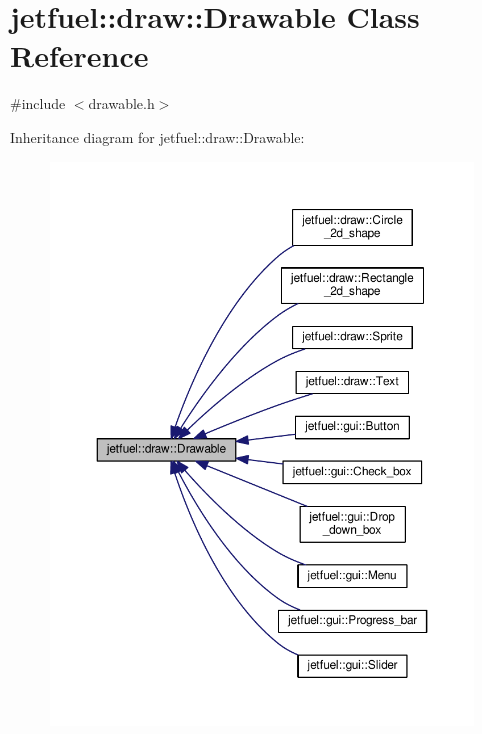 \hypertarget{classjetfuel_1_1draw_1_1Drawable}{}\section{jetfuel\+:\+:draw\+:\+:Drawable Class Reference}
\label{classjetfuel_1_1draw_1_1Drawable}


{\ttfamily \#include $<$drawable.\+h$>$}



Inheritance diagram for jetfuel\+:\+:draw\+:\+:Drawable\+:\nopagebreak
\begin{figure}[H]
\begin{center}
\leavevmode
\includegraphics[width=350pt]{classjetfuel_1_1draw_1_1Drawable__inherit__graph}
\end{center}
\end{figure}
